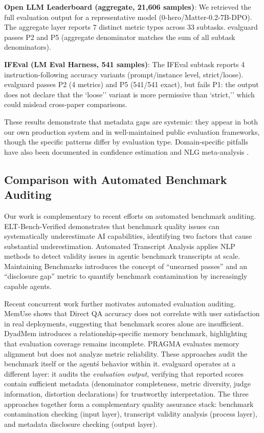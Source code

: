 \documentclass[11pt]{article}
\begin{document}
\textbf{Open LLM Leaderboard (aggregate, 21{,}606 samples)}: We retrieved the full evaluation output for a representative model (0-hero/Matter-0.2-7B-DPO). The aggregate layer reports 7 distinct metric types across 33 subtasks. evalguard passes P2 and P5 (aggregate denominator matches the sum of all subtask denominators).

\textbf{IFEval (LM Eval Harness, 541 samples)}: The IFEval subtask reports 4 instruction-following accuracy variants (prompt/instance level, strict/loose). evalguard passes P2 (4 metrics) and P5 (541/541 exact), but fails P1: the output does not declare that the `loose'' variant is more permissive than `strict,'' which could mislead cross-paper comparisons.

These results demonstrate that metadata gaps are systemic: they appear in both our own production system and in well-maintained public evaluation frameworks, though the specific patterns differ by evaluation type. Domain-specific pitfalls have also been documented in confidence estimation \citep{eval_pitfalls_conf_2026} and NLG meta-analysis \citep{nlg_meta_2026}.

\subsection{Comparison with Automated Benchmark Auditing}

Our work is complementary to recent efforts on automated benchmark auditing. ELT-Bench-Verified  demonstrates that benchmark quality issues can systematically underestimate AI capabilities, identifying two factors that cause substantial underestimation. Automated Transcript Analysis  applies NLP methods to detect validity issues in agentic benchmark transcripts at scale. Maintaining Benchmarks  introduces the concept of ``unearned passes'' and an ``disclosure gap'' metric to quantify benchmark contamination by increasingly capable agents.

Recent concurrent work further motivates automated evaluation auditing. MemUse  shows that Direct QA accuracy does not correlate with user satisfaction in real deployments, suggesting that benchmark scores alone are insufficient. DyadMem  introduces a relationship-specific memory benchmark, highlighting that evaluation coverage remains incomplete. PRAGMA  evaluates memory alignment but does not analyze metric reliability. These approaches audit the benchmark itself or the agent\'s behavior within it. evalguard operates at a different layer: it audits the \emph{evaluation output}, verifying that reported scores contain sufficient metadata (denominator completeness, metric diversity, judge information, distortion declarations) for trustworthy interpretation. The three approaches together form a complementary quality assurance stack: benchmark contamination checking (input layer), transcript validity analysis (process layer), and metadata disclosure checking (output layer).
\end{document}

